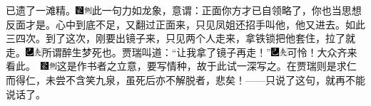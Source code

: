 已遗了一滩精。{\includegraphics[width=3mm]{../Images/00006}\includegraphics[width=3mm]{../Images/00011}\footnotesize \kaishu 此一句力如龙象，意谓：正面你方才已自领略了，你也当思想反面才是。}心中到底不足，又翻过正面来，只见凤姐还招手叫他，他又进去。如此三四次。到了这次，刚要出镜子来，只见两个人走来，拿铁锁把他套住，拉了就走。{\includegraphics[width=3mm]{../Images/00003}\includegraphics[width=3mm]{../Images/00012}\footnotesize \kaishu 所谓醉生梦死也。}贾瑞叫道：``让我拿了镜子再走！''{\includegraphics[width=3mm]{../Images/00003}\includegraphics[width=3mm]{../Images/00012}\footnotesize \kaishu 可怜！大众齐来看此。　\includegraphics[width=3mm]{../Images/00006}\includegraphics[width=3mm]{../Images/00011}\footnotesize \kaishu 这是作书者之立意，要写情种，故于此试一深写之。在贾瑞则是求仁而得仁，未尝不含笑九泉，虽死后亦不解脱者，悲矣！}------只说了这句，就再不能说话了。

